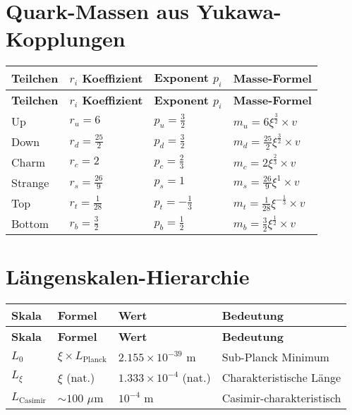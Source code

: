 \documentclass[12pt,a4paper]{article}
\begin{document}
	\section{Quark-Massen aus Yukawa-Kopplungen}
	
	\begin{longtable}{|p{2.5cm}|p{3cm}|p{3cm}|p{5cm}|}
		\hline
		\textbf{Teilchen} & \textbf{\(r_i\) Koeffizient} & \textbf{Exponent \(p_i\)} & \textbf{Masse-Formel} \\
		\hline
		\endfirsthead
		\hline
		\textbf{Teilchen} & \textbf{\(r_i\) Koeffizient} & \textbf{Exponent \(p_i\)} & \textbf{Masse-Formel} \\
		\hline
		\endhead
		Up & \(r_u = 6\) & \(p_u = \frac{3}{2}\) & \(m_u = 6\xi^{\frac{3}{2}} \times v\) \\
		\hline
		Down & \(r_d = \frac{25}{2}\) & \(p_d = \frac{3}{2}\) & \(m_d = \frac{25}{2}\xi^{\frac{3}{2}} \times v\) \\
		\hline
		Charm & \(r_c = 2\) & \(p_c = \frac{2}{3}\) & \(m_c = 2\xi^{\frac{2}{3}} \times v\) \\
		\hline
		Strange & \(r_s = \frac{26}{9}\) & \(p_s = 1\) & \(m_s = \frac{26}{9}\xi^{1} \times v\) \\
		\hline
		Top & \(r_t = \frac{1}{28}\) & \(p_t = -\frac{1}{3}\) & \(m_t = \frac{1}{28}\xi^{-\frac{1}{3}} \times v\) \\
		\hline
		Bottom & \(r_b = \frac{3}{2}\) & \(p_b = \frac{1}{2}\) & \(m_b = \frac{3}{2}\xi^{\frac{1}{2}} \times v\) \\
		\hline
	\end{longtable}
	
	\section{Längenskalen-Hierarchie}
	
	\begin{longtable}{|p{3cm}|p{4cm}|p{4cm}|p{4cm}|}
		\hline
		\textbf{Skala} & \textbf{Formel} & \textbf{Wert} & \textbf{Bedeutung} \\
		\hline
		\endfirsthead
		\hline
		\textbf{Skala} & \textbf{Formel} & \textbf{Wert} & \textbf{Bedeutung} \\
		\hline
		\endhead
		\(L_0\) & \(\xi \times L_{\text{Planck}}\) & \(2.155 \times 10^{-39}\) m & Sub-Planck Minimum \\
		\hline
		\(L_{\xi}\) & \(\xi\) (nat.) & \(1.333 \times 10^{-4}\) (nat.) & Charakteristische Länge \\
		\hline
		\(L_{\text{Casimir}}\) & \(\sim 100\) \(\mu\)m & \(10^{-4}\) m & Casimir-charakteristisch \\
		\hline
	\end{longtable}
	
\end{document}
